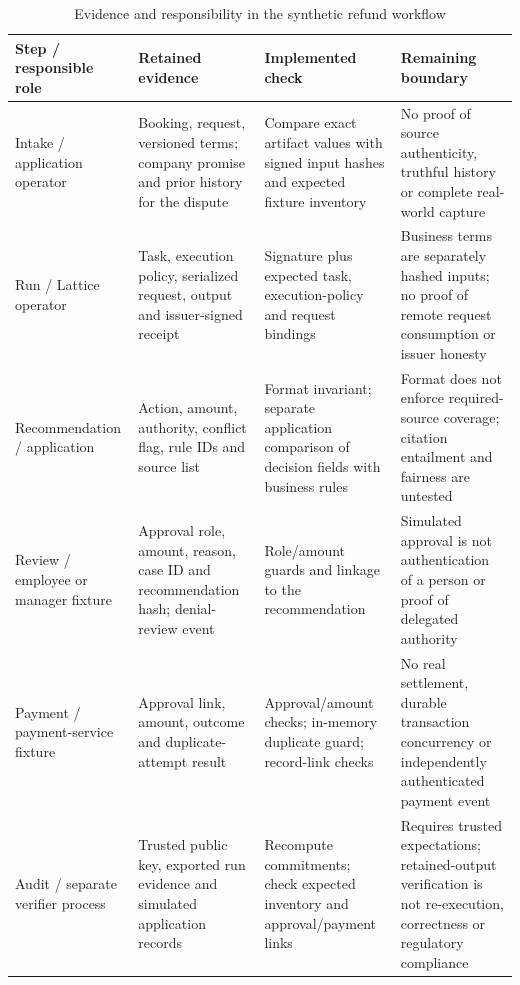\begin{table}[!htbp]
\centering
\caption{Evidence and responsibility in the synthetic refund workflow}
\label{tab:refund-evidence}
\footnotesize{}
\begin{tabularx}{\textwidth}{@{}>{\raggedright\arraybackslash}p{29mm}>{\raggedright\arraybackslash}X>{\raggedright\arraybackslash}X>{\raggedright\arraybackslash}X@{}}
\toprule
Step / responsible role & Retained evidence & Implemented check & Remaining boundary \\
\midrule
Intake / application operator & Booking, request, versioned terms; company promise and prior history for the dispute & Compare exact artifact values with signed input hashes and expected fixture inventory & No proof of source authenticity, truthful history or complete real-world capture \\[4pt]
Run / Lattice operator & Task, execution policy, serialized request, output and issuer-signed receipt & Signature plus expected task, execution-policy and request bindings & Business terms are separately hashed inputs; no proof of remote request consumption or issuer honesty \\[4pt]
Recommendation / application & Action, amount, authority, conflict flag, rule IDs and source list & Format invariant; separate application comparison of decision fields with business rules & Format does not enforce required-source coverage; citation entailment and fairness are untested \\[4pt]
Review / employee or manager fixture & Approval role, amount, reason, case ID and recommendation hash; denial-review event & Role/amount guards and linkage to the recommendation & Simulated approval is not authentication of a person or proof of delegated authority \\[4pt]
Payment / payment-service fixture & Approval link, amount, outcome and duplicate-attempt result & Approval/amount checks; in-memory duplicate guard; record-link checks & No real settlement, durable transaction concurrency or independently authenticated payment event \\[4pt]
Audit / separate verifier process & Trusted public key, exported run evidence and simulated application records & Recompute commitments; check expected inventory and approval/payment links & Requires trusted expectations; retained-output verification is not re-execution, correctness or regulatory compliance \\
\bottomrule
\end{tabularx}
\end{table}
\FloatBarrier


\FloatBarrier
